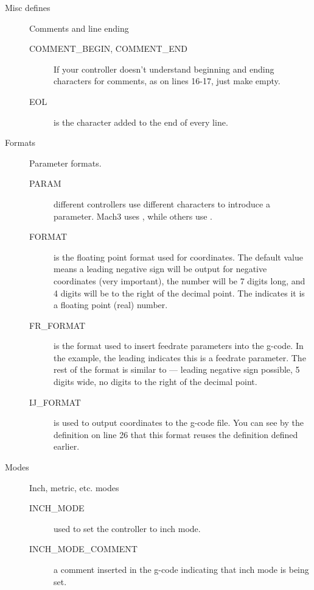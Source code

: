 \documentclass[11pt]{book}
\begin{document}
\begin{description}
\item[Misc defines] Comments and line ending
\begin{description}
	\item[COMMENT\_{}BEGIN, COMMENT\_{}END] If your controller doesn't understand beginning and ending characters for comments, as on lines 16-17, just make  empty.

	\item[EOL] is the character added to the end of every line.
\end{description}

\item[Formats] Parameter formats.
\begin{description}
    \item[PARAM] different controllers use different characters to introduce a parameter. Mach3 uses , while others use \code{\#}.
    
    \item[FORMAT] is the floating point format used for coordinates. The default value  means a leading negative sign will be output for negative coordinates (very important), the number will be 7 digits long, and 4 digits will be to the right of the decimal point. The  indicates it is a floating point (real) number.
    
    \item[FR\_{}FORMAT] is the format used to insert feedrate parameters into the g-code. In the example, the leading  indicates this is a feedrate parameter. The rest of the format is similar to  --- leading negative sign possible, 5 digits wide, no digits to the right of the decimal point.
    
    \item[IJ\_{}FORMAT] is used to output  coordinates to the g-code file. You can see by the definition on line 26 that this format reuses the  definition defined earlier.
\end{description}

\item[Modes] Inch, metric, etc. modes
\begin{description}
    \item[INCH\_{}MODE] used to set the controller to inch mode.
    
    \item[INCH\_{}MODE\_{}COMMENT] a comment inserted in the g-code indicating that inch mode is being set.
    

\end{description}
\end{description}
\end{document}
